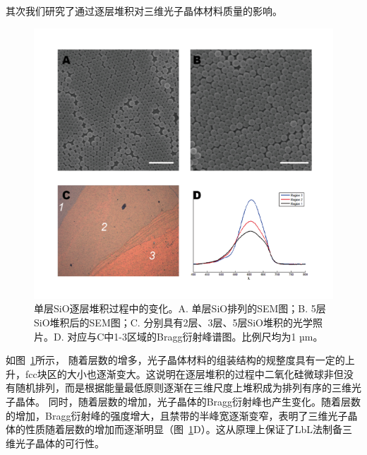 其次我们研究了通过逐层堆积对三维光子晶体材料质量的影响。
\begin{figure}[htbp]
  \centering
  \includegraphics[width=0.95\linewidth]{figures/ch2/multilayer.png}
  \caption{单层SiO逐层堆积过程中的变化。A. 单层SiO排列的SEM图；B. 5层SiO堆积后的SEM图；C. 分别具有2层、3层、5层SiO堆积的光学照片。D. 对应与C中1-3区域的Bragg衍射峰谱图。比例尺均为1 µm。}
  \label{fig:mono-stack}
\end{figure}
如图~\ref{fig:mono-stack}所示，
随着层数的增多，光子晶体材料的组装结构的规整度具有一定的上升，fcc块区的大小也逐渐变大。这说明在逐层堆积的过程中二氧化硅微球非但没有随机排列，而是根据能量最低原则逐渐在三维尺度上堆积成为排列有序的三维光子晶体。
同时，随着层数的增加，光子晶体的Bragg衍射峰也产生变化。随着层数的增加，Bragg衍射峰的强度增大，且禁带的半峰宽逐渐变窄，表明了三维光子晶体的性质随着层数的增加而逐渐明显（图~\ref{fig:mono-stack}D）。这从原理上保证了LbL法制备三维光子晶体的可行性。

